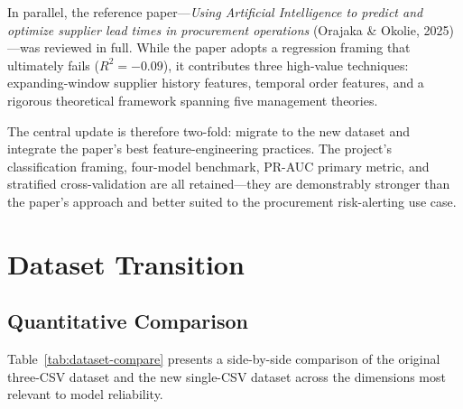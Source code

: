 \documentclass[11pt,a4paper]{article}
\begin{document}
In parallel, the reference paper---\textit{Using Artificial Intelligence to predict and
optimize supplier lead times in procurement operations} (Orajaka \& Okolie, 2025)---was
reviewed in full. While the paper adopts a regression framing that ultimately fails
($R^2 = -0.09$), it contributes three high-value techniques: expanding-window supplier
history features, temporal order features, and a rigorous theoretical framework spanning
five management theories.

The central update is therefore two-fold: migrate to the new dataset and integrate the
paper's best feature-engineering practices. The project's classification framing,
four-model benchmark, PR-AUC primary metric, and stratified cross-validation are all
retained---they are demonstrably stronger than the paper's approach and better suited
to the procurement risk-alerting use case.

\section{Dataset Transition}

\subsection{Quantitative Comparison}

Table~\ref{tab:dataset-compare} presents a side-by-side comparison of the original
three-CSV dataset and the new single-CSV dataset across the dimensions most relevant
to model reliability.
\end{document}
